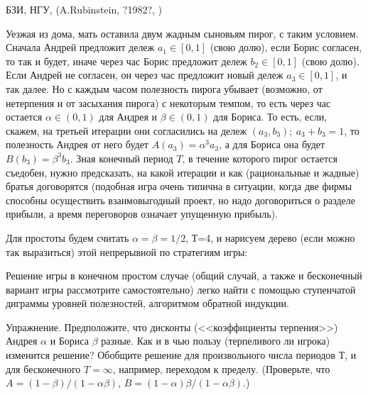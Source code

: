 \begin{problem}
\begin{source}
БЗИ, НГУ, (A.Rubinstein,   {?1982?}, \cite{miller:gtw})
\end{source}

Уезжая из дома, мать оставила двум жадным сыновьям пирог, с
таким условием. Сначала Андрей предложит дележ $a_1\in
[0,1]$ (свою долю), если Борис согласен, то так и будет,
иначе через час Борис предложит дележ $b_2\in [0,1]$ (свою
долю). Если Андрей не согласен, он через час предложит
новый дележ $a_3\in [0,1]$, и так далее. Но с каждым часом
полезность пирога убывает (возможно, от нетерпения и от
засыхания пирога) с некоторым темпом, то есть через час
остается $\alpha\in (0,1)$ для Андрея и $\beta\in (0,1)$
для Бориса. То есть, если, скажем, на третьей итерации они
согласились на дележ $(a_3, b_3); ~ a_3+ b_3=1$, то
полезность Андрея от него будет $A(a_3)=\alpha^3 a_3$, а для 
Бориса она будет $B(b_3)=\beta^3 b_3$. Зная конечный период $T$, в течение
которого пирог остается съедобен, нужно предсказать, на
какой итерации и как (рациональные и жадные) братья
договорятся (подобная игра очень типична в ситуации, когда
две фирмы способны осуществить взаимовыгодный проект, но
надо договориться о разделе прибыли, а время переговоров
означает упущенную прибыль).

Для простоты будем считать $\alpha = \beta =1/2$, Т=4, и
нарисуем дерево (если можно так выразиться) этой
непрерывной по стратегиям игры:

Решение игры в конечном простом случае (общий случай, а также и
бесконечный вариант игры рассмотрите самостоятельно) легко
найти с помощью ступенчатой диграммы уровней полезностей,
алгоритмом обратной индукции.

Упражнение. Предположите, что дисконты (<<коэффициенты
терпения>>) Андрея $\alpha$ и Бориса $\beta$ разные. Как и в
чью пользу (терпеливого ли игрока) изменится решение? Обобщите
решение для произвольного числа периодов Т, и для
бесконечного $T=\infty$, например, переходом к пределу.
(Проверьте, что $A=(1-\beta)/(1-\alpha\beta)$,
$B=(1-\alpha)\beta/(1-\alpha\beta)$.)



\begin{sol}

\end{sol}
\end{problem}







